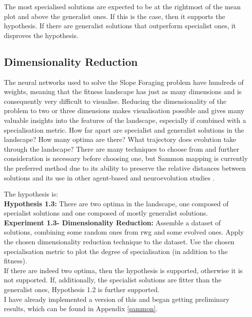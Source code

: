 \documentclass[12pt]{article}
\begin{document}
The most specialised solutions are expected to be at the rightmost of the mean plot and above the generalist ones.
If this is the case, then it supports the hypothesis.
If there are generalist solutions that outperform specialist ones, it disproves the hypothesis.

\subsection{Dimensionality Reduction}

The neural networks used to solve the Slope Foraging problem have hundreds of weights, meaning that the fitness landscape has just as many dimensions and is consequently very difficult to visualise.
Reducing the dimensionality of the problem to two or three dimensions makes visualisation possible and gives many valuable insights into the features of the landscape, especially if combined with a specialisation metric.
How far apart are specialist and generalist solutions in the landscape?
How many optima are there?
What trajectory does evolution take through the landscape?
There are many techniques to choose from \cite{veerapen:GPEM:2018} and further consideration is necessary before choosing one, but Sammon mapping \cite{sammon:IEEETR:1969} is currently the preferred method due to its ability to preserve the relative distances between solutions and its use in other agent-based and neuroevolution studies \cite{kim:GECCO:2003, risi:AB:2010}.

The hypothesis is:\\

\textbf{Hypothesis 1.3:} There are two optima in the landscape, one composed of specialist solutions and one composed of mostly generalist solutions. \\

\textbf{Experiment 1.3- Dimensionality Reduction:} Assemble a dataset of solutions, combining some random ones from rwg and some evolved ones.
Apply the chosen dimensionality reduction technique to the dataset.
Use the chosen specialisation metric to plot the degree of specialisation (in addition to the fitness).\\

If there are indeed two optima, then the hypothesis is supported, otherwise it is not supported.
If, additionally, the specialist solutions are fitter than the generalist ones, Hypothesis 1.2 is further supported.\\

I have already implemented a version of this and began getting preliminary results, which can be found in Appendix \ref{sammon}.
\end{document}
